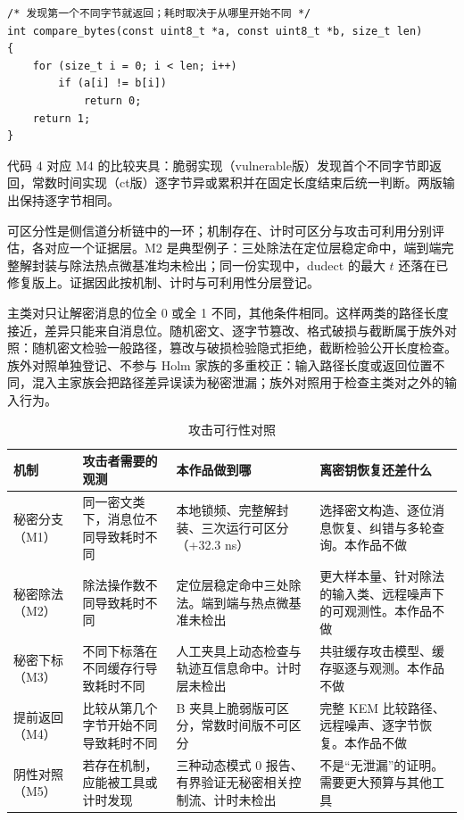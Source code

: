 \noindent\begin{minipage}{\linewidth}
\begin{lstlisting}[caption={提前返回比较的最小形态},label={code:early}]
/* 发现第一个不同字节就返回；耗时取决于从哪里开始不同 */
int compare_bytes(const uint8_t *a, const uint8_t *b, size_t len)
{
    for (size_t i = 0; i < len; i++)
        if (a[i] != b[i])
            return 0;
    return 1;
}
\end{lstlisting}
\end{minipage}

代码 4 对应 M4 的比较夹具：脆弱实现（vulnerable版）发现首个不同字节即返回，常数时间实现（ct版）逐字节异或累积并在固定长度结束后统一判断。两版输出保持逐字节相同。

可区分性是侧信道分析链中的一环；机制存在、计时可区分与攻击可利用分别评估，各对应一个证据层。M2 是典型例子：三处除法在定位层稳定命中，端到端完整解封装与除法热点微基准均未检出；同一份实现中，dudect 的最大 $t$ 还落在已修复版上。证据因此按机制、计时与可利用性分层登记。

主类对只让解密消息的位全 0 或全 1 不同，其他条件相同。这样两类的路径长度接近，差异只能来自消息位。随机密文、逐字节篡改、格式破损与截断属于族外对照：随机密文检验一般路径，篡改与破损检验隐式拒绝，截断检验公开长度检查。族外对照单独登记、不参与 Holm 家族的多重校正：输入路径长度或返回位置不同，混入主家族会把路径差异误读为秘密泄漏；族外对照用于检查主类对之外的输入行为。

\begin{table}[H]
\centering
\caption{攻击可行性对照}
\label{tab:attack}
{\footnotesize
\begin{tabularx}{\textwidth}{|>{\raggedright\arraybackslash}p{2.2cm}|>{\raggedright\arraybackslash}X|>{\raggedright\arraybackslash}X|>{\raggedright\arraybackslash}X|}
\hline
机制 & 攻击者需要的观测 & 本作品做到哪 & 离密钥恢复还差什么 \\
\hline
秘密分支（M1） & 同一密文类下，消息位不同导致耗时不同 & 本地锁频、完整解封装、三次运行可区分（+32.3 ns） & 选择密文构造、逐位消息恢复、纠错与多轮查询。本作品不做 \\
\hline
秘密除法（M2） & 除法操作数不同导致耗时不同 & 定位层稳定命中三处除法。端到端与热点微基准未检出 & 更大样本量、针对除法的输入类、远程噪声下的可观测性。本作品不做 \\
\hline
秘密下标（M3） & 不同下标落在不同缓存行导致耗时不同 & 人工夹具上动态检查与轨迹互信息命中。计时层未检出 & 共驻缓存攻击模型、缓存驱逐与观测。本作品不做 \\
\hline
提前返回（M4） & 比较从第几个字节开始不同导致耗时不同 & 32 B 夹具上脆弱版可区分，常数时间版不可区分 & 完整 KEM 比较路径、远程噪声、逐字节恢复。本作品不做 \\
\hline
阴性对照（M5） & 若存在机制，应能被工具或计时发现 & 三种动态模式 0 报告、有界验证无秘密相关控制流、计时未检出 & 不是“无泄漏”的证明。需要更大预算与其他工具 \\
\hline
\end{tabularx}
}
\end{table}

